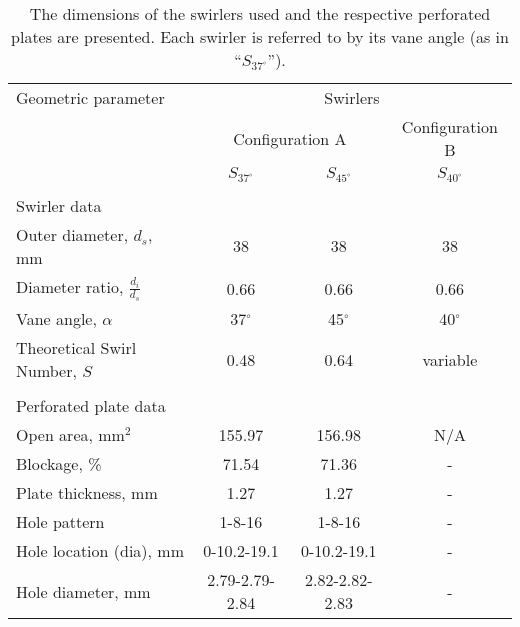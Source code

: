 \begin{table}
  \caption[Swirler dimensions]{The dimensions of the swirlers used and the respective perforated plates are presented. Each swirler is referred to by its vane angle (as in ``\(S_{37^\circ}\)'').}
  \begin{center}
    \begin{tabular}{lccc}
      Geometric parameter & \multicolumn{3}{c}{Swirlers}\tabularnewline
      & \multicolumn{2}{c}{Configuration A} & Configuration B\tabularnewline
      & \(S_{37^\circ}\) & \(S_{45^\circ}\) & \(S_{40^\circ}\)\tabularnewline
      \hline \hline
      & & &\tabularnewline
      Swirler data & & & \tabularnewline
      \hline
      Outer diameter, \(d_s\), mm & 38 & 38 & 38\tabularnewline
      Diameter ratio, \(\frac{d_i}{d_s}\) & 0.66 & 0.66 & 0.66\tabularnewline
      Vane angle, \(\alpha\) & 37\(^\circ\) & 45\(^\circ\) & 40\(^\circ\)\tabularnewline
      Theoretical Swirl Number, \(S\) & 0.48 & 0.64 & variable\tabularnewline
      & & &\tabularnewline
      Perforated plate data & & & \tabularnewline
      \hline
      Open area, mm\(^2\) & 155.97 & 156.98 & N/A\tabularnewline
      Blockage, \% & 71.54 & 71.36 & -\tabularnewline
      Plate thickness, mm & 1.27 & 1.27 & - \tabularnewline
      Hole pattern & 1-8-16 & 1-8-16 & - \tabularnewline
      Hole location (dia), mm & 0-10.2-19.1 & 0-10.2-19.1 & -\tabularnewline
      Hole diameter, mm & 2.79-2.79-2.84 & 2.82-2.82-2.83 & -\tabularnewline
      \hline
    \end{tabular}
  \end{center}
  \label{tab:swirlerDimensions}
\end{table}

